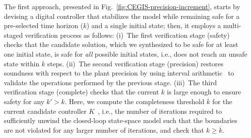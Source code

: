 \documentclass[10pt,conference]{IEEEtran}
\begin{document}
The first approach, presented in Fig.~\ref{fig:CEGIS-precision-increment},
starts by devising a digital controller that stabilizes the model while
remaining safe for a pre-selected time horizon ($k$) and a single initial
state; then, it employs a multi-staged verification process as follows:
(i)~The first verification stage ({\sc safety}) checks that the candidate
solution, which we synthesized to be safe for at least one initial
state, is safe for \emph{all} possible initial states, i.e., does not reach
an unsafe state within $k$ steps.
(ii)~The second verification stage ({\sc precision})
 restores soundness with respect to the plant precision
by using interval arithmetic~\cite{moore1966interval} to validate the 
operations performed by the previous stage. 
(iii)~The third verification stage ({\sc complete}) checks that the current
$k$ is large enough to ensure safety for any $k'{>}k$.  Here, we compute the
completeness threshold $\overline{k}$ for the current candidate controller 
$K$~\cite{abatecav2017}, i.e., the number of
iterations required to sufficiently unwind the closed-loop state-space
model such that the boundaries are not violated for any larger number of
iterations, and
check that $k{\geq}\overline{k}$.
%
\end{document}

